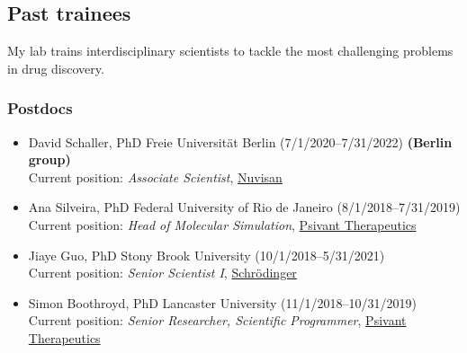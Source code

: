\documentclass[10pt]{article}
\begin{document}
\eject

\subsection*{Past trainees}

My lab trains interdisciplinary scientists to tackle the most challenging problems in drug discovery.

\subsubsection*{Postdocs}

\begin{itemize}
  \item David Schaller, PhD Freie Universit\"{a}t Berlin (7/1/2020--7/31/2022) {\bf (Berlin group)}\\
  Current position: \emph{Associate Scientist}, \href{https://www.nuvisan.com/}{Nuvisan}
  
   \item Ana Silveira, PhD Federal University of Rio de Janeiro (8/1/2018--7/31/2019)\\
  Current position: \emph{Head of Molecular Simulation}, \href{https://psivant.com/}{Psivant Therapeutics}  

  \item Jiaye Guo, PhD Stony Brook University (10/1/2018--5/31/2021)\\
  Current position: \emph{Senior Scientist I}, \href{http://schrodinger.com}{Schr\"{o}dinger}
  
  \item Simon Boothroyd, PhD Lancaster University (11/1/2018--10/31/2019)\\
  Current position: \emph{Senior Researcher, Scientific Programmer}, \href{https://psivant.com/}{Psivant Therapeutics}  
  

\end{itemize}
\end{document}
